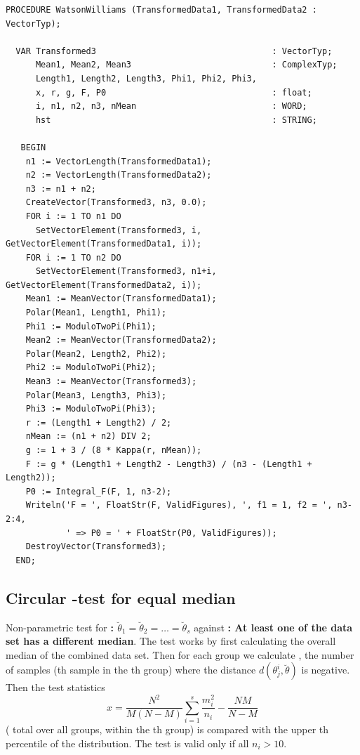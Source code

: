 \begin{refsection}
\begin{lstlisting}[caption=Watson-Williams test]
  PROCEDURE WatsonWilliams (TransformedData1, TransformedData2 : VectorTyp);

  VAR Transformed3                                   : VectorTyp;
      Mean1, Mean2, Mean3                            : ComplexTyp;
      Length1, Length2, Length3, Phi1, Phi2, Phi3,
      x, r, g, F, P0                                 : float;
      i, n1, n2, n3, nMean                           : WORD;
      hst                                            : STRING;

   BEGIN
    n1 := VectorLength(TransformedData1);
    n2 := VectorLength(TransformedData2);
    n3 := n1 + n2;
    CreateVector(Transformed3, n3, 0.0);
    FOR i := 1 TO n1 DO
      SetVectorElement(Transformed3, i, GetVectorElement(TransformedData1, i));
    FOR i := 1 TO n2 DO
      SetVectorElement(Transformed3, n1+i, GetVectorElement(TransformedData2, i));
    Mean1 := MeanVector(TransformedData1);
    Polar(Mean1, Length1, Phi1);
    Phi1 := ModuloTwoPi(Phi1);
    Mean2 := MeanVector(TransformedData2);
    Polar(Mean2, Length2, Phi2);
    Phi2 := ModuloTwoPi(Phi2);
    Mean3 := MeanVector(Transformed3);
    Polar(Mean3, Length3, Phi3);
    Phi3 := ModuloTwoPi(Phi3);
    r := (Length1 + Length2) / 2;
    nMean := (n1 + n2) DIV 2;
    g := 1 + 3 / (8 * Kappa(r, nMean));
    F := g * (Length1 + Length2 - Length3) / (n3 - (Length1 + Length2));
    P0 := Integral_F(F, 1, n3-2);
    Writeln('F = ', FloatStr(F, ValidFigures), ', f1 = 1, f2 = ', n3-2:4,
            ' => P0 = ' + FloatStr(P0, ValidFigures));
    DestroyVector(Transformed3);
  END;
\end{lstlisting}

\subsection{Circular -test for equal median}

Non-parametric test for \textbf{:  \( \breve{\theta}_1 = \breve{\theta}_2 = \ldots = \breve{\theta}_s \)} against \textbf{: At least one of the data set has a different median}. The test works by first calculating the overall median of the combined data set. Then for each group  we calculate , the number of samples  (th sample in the th group) where the distance \( d(\theta_j^i, \breve{\theta}) \) is negative. Then the test statistics
\begin{equation}
  x = \frac{N^2}{M (N-M)}\sum_{i=1}^s\frac{m_i^2}{n_i} - \frac{N M}{N - M}
\end{equation}
( total over all groups,  within the th group) is compared with the upper th percentile of the  distribution. The test is valid only if all \( n_i > 10 \).


\end{refsection}
